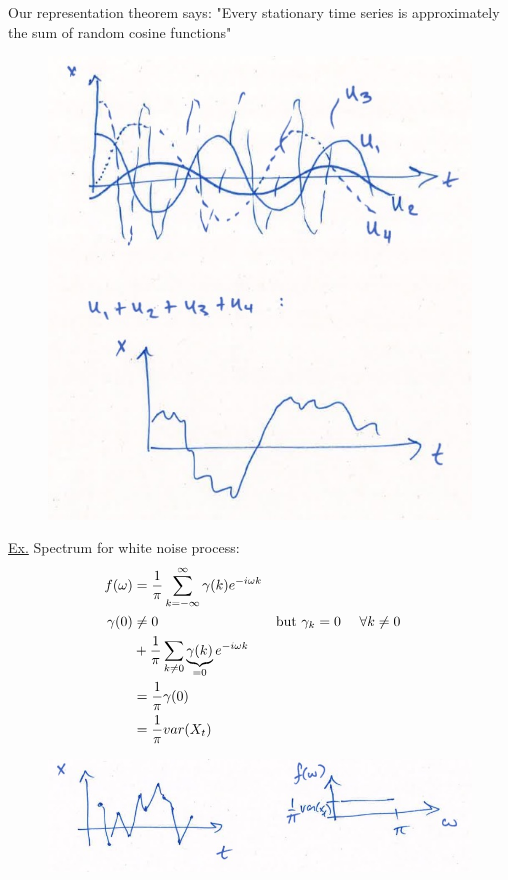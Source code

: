 Our representation theorem says: "Every stationary time series is approximately the sum of random cosine functions"

\begin{figure}[H]
\includegraphics[scale=0.3]{images/Screenshot 2024-04-29 at 08.42.31.jpg}
\centering
\end{figure}


\underline{Ex.} Spectrum for white noise process:
\begin{align*}
    f(\omega)&=\frac{1}{\pi} \sum_{k=-\infty}^\infty \gamma(k) e^{-i\omega k}\\
    \gamma(0) & \neq 0 &&\text{but $\gamma_k = 0$ \quad $\forall k\neq0$} \\
    &+ \frac{1}{\pi} \sum_{k\neq 0} \underbrace{\gamma(k)}_{=0} e^{-i\omega k} \\
    &= \frac{1}{\pi} \gamma(0)\\
    &= \frac{1}{\pi}var(X_t)
\end{align*}

\begin{figure}[h]
\includegraphics[scale=0.4]{images/Screenshot 2024-04-29 at 08.42.56.jpg}
\centering
\end{figure}


